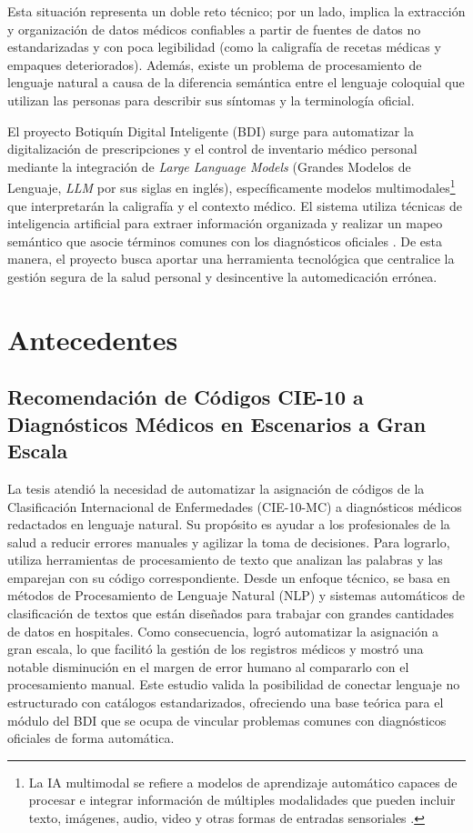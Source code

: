 Esta situación representa un doble reto técnico; por un lado, implica la extracción y organización de datos médicos confiables a partir de fuentes de datos no estandarizadas y con poca legibilidad (como la caligrafía de recetas médicas y empaques deteriorados). Además, existe un problema de procesamiento de lenguaje natural a causa de la diferencia semántica entre el lenguaje coloquial que utilizan las personas para describir sus síntomas y la terminología oficial.

El proyecto Botiquín Digital Inteligente ({BDI}) surge para automatizar la digitalización de prescripciones y el control de inventario médico personal mediante la integración de \emph{Large Language Models} (Grandes Modelos de Lenguaje, \emph{LLM} por sus siglas en inglés), específicamente modelos multimodales\footnote{La IA multimodal se refiere a modelos de aprendizaje automático capaces de procesar e integrar información de múltiples modalidades que pueden incluir texto, imágenes, audio, video y otras formas de entradas sensoriales \cite{multimodales}.} que interpretarán la caligrafía y el contexto médico. El sistema utiliza técnicas de inteligencia artificial para extraer información organizada y realizar un mapeo semántico que asocie términos comunes con los diagnósticos oficiales \cite{CIE10}. De esta manera, el proyecto busca aportar una herramienta tecnológica que centralice la gestión segura de la salud personal y desincentive la automedicación errónea.

\clearpage

\section{Antecedentes} 

\subsection[Recomendación de Códigos CIE-10 a Diagnósticos Médicos en Escenarios a Gran Escala]{Recomendación de Códigos CIE-10 a Diagnósticos Médicos en Escenarios a Gran Escala} 
La tesis \cite{Velasco} atendió la necesidad de automatizar la asignación de códigos de la Clasificación Internacional de Enfermedades (CIE-10-MC) a diagnósticos médicos redactados en lenguaje natural. Su propósito es ayudar a los profesionales de la salud a reducir errores manuales y agilizar la toma de decisiones. Para lograrlo, utiliza herramientas de procesamiento de texto que analizan las palabras y las emparejan con su código correspondiente. Desde un enfoque técnico, se basa en métodos de Procesamiento de Lenguaje Natural (NLP) y sistemas automáticos de clasificación de textos que están diseñados para trabajar con grandes cantidades de datos en hospitales. Como consecuencia, logró automatizar la asignación a gran escala, lo que facilitó la gestión de los registros médicos y mostró una notable disminución en el margen de error humano al compararlo con el procesamiento manual. Este estudio valida la posibilidad de conectar lenguaje no estructurado con catálogos estandarizados, ofreciendo una base teórica para el módulo del BDI que se ocupa de vincular problemas comunes con diagnósticos oficiales de forma automática.


